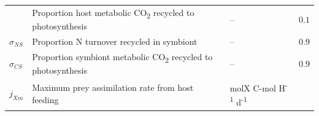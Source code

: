 \documentclass[]{elsarticle} %
\begin{document}
\begin{longtable}[c]{@{}llll@{}}
\begin{minipage}[t]{0.10\columnwidth}
\strut\end{minipage} &
\begin{minipage}[t]{0.45\columnwidth}\raggedright\strut
Proportion host metabolic CO\textsubscript{2} recycled to photosynthesis
\strut\end{minipage} &
\begin{minipage}[t]{0.25\columnwidth}\raggedright\strut
--
\strut\end{minipage} &
\begin{minipage}[t]{0.12\columnwidth}\raggedright\strut
\(0.1\)
\strut\end{minipage}\tabularnewline
\begin{minipage}[t]{0.10\columnwidth}\raggedright\strut
\(\sigma_{NS}\)
\strut\end{minipage} &
\begin{minipage}[t]{0.45\columnwidth}\raggedright\strut
Proportion N turnover recycled in symbiont
\strut\end{minipage} &
\begin{minipage}[t]{0.25\columnwidth}\raggedright\strut
--
\strut\end{minipage} &
\begin{minipage}[t]{0.12\columnwidth}\raggedright\strut
\(0.9\)
\strut\end{minipage}\tabularnewline
\begin{minipage}[t]{0.10\columnwidth}\raggedright\strut
\(\sigma_{CS}\)
\strut\end{minipage} &
\begin{minipage}[t]{0.45\columnwidth}\raggedright\strut
Proportion symbiont metabolic CO\textsubscript{2} recycled to
photosynthesis
\strut\end{minipage} &
\begin{minipage}[t]{0.25\columnwidth}\raggedright\strut
--
\strut\end{minipage} &
\begin{minipage}[t]{0.12\columnwidth}\raggedright\strut
\(0.9\)
\strut\end{minipage}\tabularnewline
\begin{minipage}[t]{0.10\columnwidth}\raggedright\strut
\(j_{Xm}\)
\strut\end{minipage} &
\begin{minipage}[t]{0.45\columnwidth}\raggedright\strut
Maximum prey assimilation rate from host feeding
\strut\end{minipage} &
\begin{minipage}[t]{0.25\columnwidth}\raggedright\strut
molX C-mol H\textsuperscript{-1} d\textsuperscript{-1}

\end{minipage}
\end{longtable}
\end{document}
